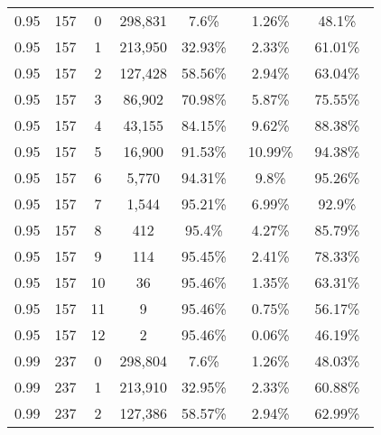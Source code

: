 \begin{figure}[!htbp]
{\begin{tabular}{ |c|c|c|c|c|c|c| }
        0.95             &157             &0            &298,831                 & 7.6\%\     & 1.26\%\               & 48.1\%\ \\
        0.95             &157             &1            &213,950                 & 32.93\%\     & 2.33\%\               & 61.01\%\ \\
        0.95             &157             &2            &127,428                 & 58.56\%\     & 2.94\%\               & 63.04\%\ \\
        0.95             &157             &3            &86,902                 & 70.98\%\     & 5.87\%\               & 75.55\%\ \\
        0.95             &157             &4            &43,155                 & 84.15\%\     & 9.62\%\               & 88.38\%\ \\
        0.95             &157             &5            &16,900                 & 91.53\%\     & 10.99\%\               & 94.38\%\ \\
        0.95             &157             &6            &5,770                 & 94.31\%\     & 9.8\%\               & 95.26\%\ \\
        0.95             &157             &7            &1,544                 & 95.21\%\     & 6.99\%\               & 92.9\%\ \\
        0.95             &157             &8            &412                 & 95.4\%\     & 4.27\%\               & 85.79\%\ \\
        0.95             &157             &9            &114                 & 95.45\%\     & 2.41\%\               & 78.33\%\ \\
        0.95             &157             &10            &36                 & 95.46\%\     & 1.35\%\               & 63.31\%\ \\
        0.95             &157             &11            &9                 & 95.46\%\     & 0.75\%\               & 56.17\%\ \\
        0.95             &157             &12            &2                 & 95.46\%\     & 0.06\%\               & 46.19\%\ \\
        \hline
        0.99             &237             &0            &298,804                 & 7.6\%\     & 1.26\%\               & 48.03\%\ \\
        0.99             &237             &1            &213,910                 & 32.95\%\     & 2.33\%\               & 60.88\%\ \\
        0.99             &237             &2            &127,386                 & 58.57\%\     & 2.94\%\               & 62.99\%\ \\

\end{tabular}}
\end{figure}
